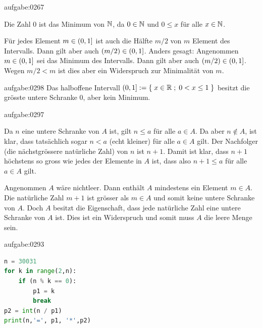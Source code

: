 \begin{antwort}{aufgabe:0267}
    \begin{aenum}
        \item Die Zahl $0$ ist das Minimum von $\mathbb{N}$, da $0\in\mathbb{N}$ und $0\leq x$ für alle $x\in\mathbb{N}$.
        \item Für jedes Element $m\in\left(0, 1\right]$ ist auch die Hälfte $m/2$ von $m$ Element des Intervalls. Dann gilt aber auch $\left(m/2\right)\in\left(0, 1\right]$. Anders gesagt: Angenommen $m\in\left(0, 1\right]$ sei das Minimum des Intervalls. Dann gilt aber auch $\left(m/2\right)\in\left(0, 1\right]$. Wegen $m/2<m$ ist dies aber ein Widerspruch zur Minimalität von $m$.
    \end{aenum}
\end{antwort}


\begin{antwort}{aufgabe:0298}
Das halboffene Intervall $\left(0, 1\right] := \left\{\;x\in\mathbb{R} \; ; \; 0<x\leq 1 \;\right\}$ besitzt die grösste untere Schranke $0$, aber kein Minimum.
\end{antwort}


\begin{antwort}{aufgabe:0297}
    \begin{aenum}
        \item Da $n$ eine untere Schranke von $A$ ist, gilt $n\leq a$ für alle $a\in A$. Da aber $n\notin A$, ist klar, dass tatsächlich sogar $n < a$ (echt kleiner) für alle $a\in A$ gilt. Der Nachfolger (die nächstgrössere natürliche Zahl) von $n$ ist $n+1$. Damit ist klar, dass $n+1$ höchstens so gross wie jedes der Elemente in $A$ ist, dass also $n+1 \leq a$ für alle $a\in A$ gilt.
        \item Angenommen $A$ wäre nichtleer. Dann enthält $A$ mindestens ein Element $m\in A$. Die natürliche Zahl $m+1$ ist grösser als $m\in A$ und somit keine untere Schranke von $A$. Doch $A$ besitzt die Eigenschaft, dass jede natürliche Zahl eine untere Schranke von $A$ ist. Dies ist ein Widerspruch und somit muss $A$ die leere Menge sein.
    \end{aenum}
\end{antwort}


\begin{antwort}{aufgabe:0293}
\begin{lstlisting}[language=Python]
n = 30031
for k in range(2,n):
    if (n % k == 0):
        p1 = k
        break
p2 = int(n / p1)
print(n,'=', p1, '*',p2)
\end{lstlisting}
\end{antwort}



